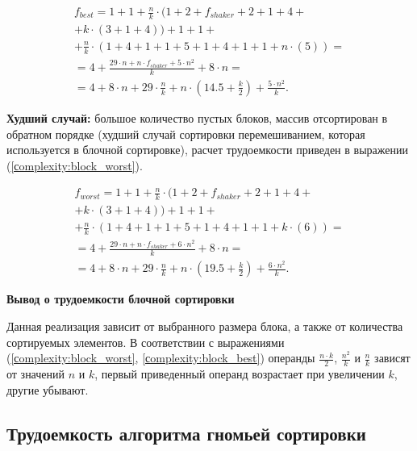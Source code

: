 \begin{equation}
	\label{сomplexity:block_best}
	\begin{gathered}
		f_{best} = 1 +1 + \frac{n}{k} \cdot(1 + 2+f_{shaker} + 2 + 1 + 4 + \\
		+ k \cdot (3 + 1 + 4)) + 1 + 1 + \\
		+ \frac{n}{k} \cdot (1 + 4 + 1 + 1 + 5 + 1 + 4 + 1 + 1 + n \cdot (5)) = \\
		= 4 + \frac{29\cdot n + n \cdot f_{shaker} + 5 \cdot n^2}{k}  + 8 \cdot n  = \\
		= 4 + 8 \cdot n + 29 \cdot \frac{n}{k} + n \cdot (14.5 + \frac{k}{2}) + \frac{5 \cdot n^2}{k}.
	\end{gathered}
\end{equation}

\textbf{Худший случай:} большое количество пустых блоков, массив отсортирован в обратном порядке (худший случай сортировки перемешиванием, которая используется в блочной сортировке), расчет трудоемкости приведен в выражении (\ref{сomplexity:block_worst}).

\begin{equation}
	\label{сomplexity:block_worst}
	\begin{gathered}
		f_{worst} = 1 +1 + \frac{n}{k} \cdot(1 + 2+f_{shaker} + 2 + 1 + 4 + \\
		+ k \cdot (3 + 1 + 4)) + 1 + 1 + \\
		 + \frac{n}{k} \cdot (1 + 4 + 1 + 1 + 5 + 1 + 4 + 1 + 1 + k \cdot (6)) = \\
		= 4 + \frac{29\cdot n + n \cdot f_{shaker} + 6 \cdot n^2}{k}  + 8 \cdot n  = \\
		= 4 + 8 \cdot n + 29 \cdot \frac{n}{k} + n \cdot (19.5 + \frac{k}{2}) + \frac{6 \cdot n^2}{k}.
	\end{gathered}
\end{equation}


\textbf{Вывод о трудоемкости блочной сортировки}

Данная реализация зависит от выбранного размера блока, а также от количества сортируемых элементов. В соответствии с выражениями (\ref{сomplexity:block_worst}, \ref{сomplexity:block_best})  операнды $\frac{n \cdot k}{2}$, $\frac{n^2}{k}$ и $\frac{n}{k}$ зависят от значений $n$ и $k$, первый приведенный операнд возрастает при увеличении $k$, другие убывают.


\subsection{Трудоемкость алгоритма гномьей сортировки}

